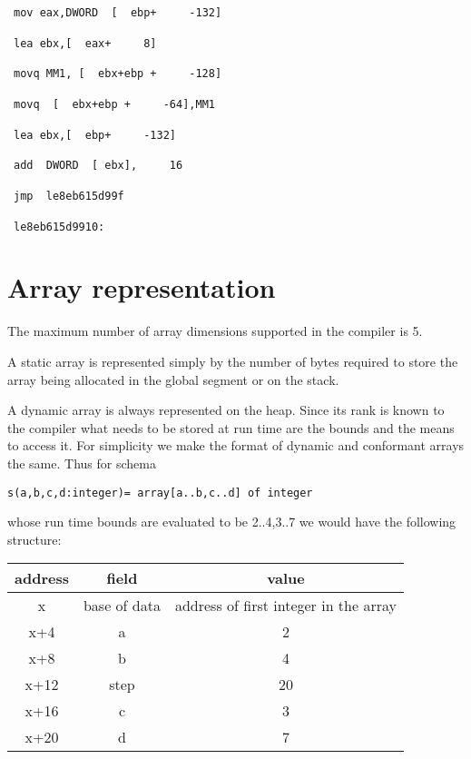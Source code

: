 {\begin{lyxcode}
~\texttt{\footnotesize mov~eax,DWORD~~{[}~~ebp+~~~~~-132{]}}{\footnotesize \par}

~\texttt{\footnotesize lea~ebx,{[}~~eax+~~~~~8{]}}{\footnotesize \par}

~\texttt{\footnotesize movq~MM1,~{[}~~ebx+ebp~+~~~~~-128{]}}{\footnotesize \par}

~\texttt{\footnotesize movq~~{[}~~ebx+ebp~+~~~~~-64{]},MM1}{\footnotesize \par}

~\texttt{\footnotesize lea~ebx,{[}~~ebp+~~~~~-132{]}}{\footnotesize \par}

~\texttt{\footnotesize add~~DWORD~~{[}~ebx{]},~~~~~16}{\footnotesize \par}

~\texttt{\footnotesize jmp~~le8eb615d99f}{\footnotesize \par}

~\texttt{\footnotesize le8eb615d9910:}{\footnotesize \par}
\end{lyxcode}

\section{Array representation}

The maximum number of array dimensions supported in the compiler is 5.

A static array is represented simply by
the number of bytes required to store the array being allocated in the global
segment or on the stack.

A dynamic array is always represented on
the heap. Since its rank is known to the compiler
what needs to be stored at run time are the bounds and the means to access it.
For simplicity we make the format of dynamic and conformant arrays the same.
Thus for schema  

\texttt{s(a,b,c,d:integer)= array{[}a..b,c..d{]} of integer }

whose run time bounds are evaluated to be 2..4,3..7 we would have the following
structure:

\vspace{0.2cm}
{\centering \begin{tabular}{|c|c|c|}
\hline 
address&
field&
value\\
\hline 
\hline 
x&
base of data&
address of first integer in the array\\
\hline 
x+4&
a&
2\\
\hline 
x+8&
b&
4\\
\hline 
x+12&
step&
20\\
\hline 
x+16&
c&
3\\
\hline 
x+20&
d&
7\\
\hline 
\end{tabular}\par}
\vspace{0.3cm}

}
